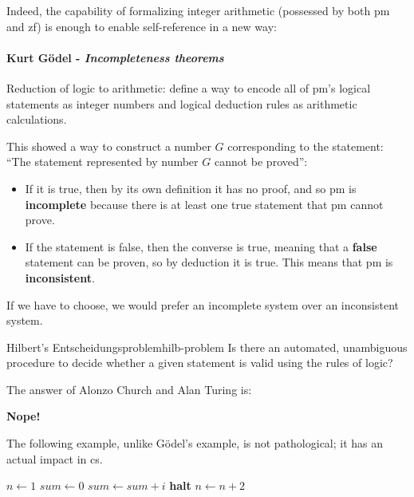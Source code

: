 Indeed, the capability of formalizing integer arithmetic (possessed by both \gls{pm} and \gls{zf}) is enough to enable self-reference in a new way:

\paragraph{Kurt Gödel - \textit{Incompleteness theorems}} Reduction of logic to arithmetic: define a way to encode all of \gls{pm}'s logical statements as integer numbers and logical deduction rules as arithmetic calculations.

This showed a way to construct a number \(G\) corresponding to the statement: ``The statement represented by number \(G\) cannot be proved'':
\begin{itemize}
    \item If it is true, then by its own definition it has no proof, and so \gls{pm} is \textbf{incomplete} because there is at least one true statement that \gls{pm} cannot prove.
    \item If the statement is false, then the converse is true, meaning that a \textbf{false} statement can be proven, so by deduction it is true. This means that \gls{pm} is \textbf{inconsistent}. 
\end{itemize}
If we have to choose, we would prefer an incomplete system over an inconsistent system.

\begin{concept}{Hilbert's Entscheidungsproblem}{hilb-problem}
    Is there an automated, unambiguous procedure to decide whether a given statement is valid using the rules of logic?
\end{concept}

The answer of Alonzo Church and Alan Turing is:
\begin{center}
    \textbf{Nope!}
\end{center}

The following example, unlike Gödel's example, is not pathological; it has an actual impact in \gls{cs}.

\begin{algorithm}[H]
    \caption{Will it Halt?}
    \begin{algorithmic}
        \State \(n\leftarrow 1\) 
        \Loop
            \State \(sum \leftarrow 0\)
             
                    \State \(sum\leftarrow sum + i\)
                \EndIf
            \EndFor
             
                \State \textbf{halt}
            \EndIf
            \State \(n\leftarrow n+2\) 
        \EndLoop
    \end{algorithmic}
\end{algorithm}

